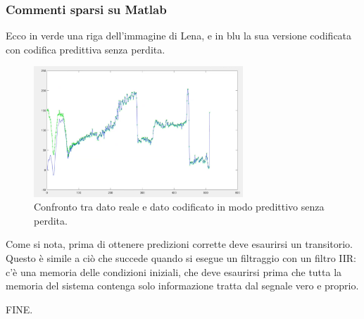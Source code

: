 \documentclass[a4paper,11pt]{article}
\begin{document}
\subsubsection{Commenti sparsi su Matlab}
Ecco in verde una riga dell'immagine di Lena, e in blu la sua versione codificata con codifica predittiva senza perdita.

\renewcommand{\thefigure}{14.1}
\begin{figure}[!h]
  \centering
    \includegraphics[width=0.7\textwidth]{images/14/lena_predicted.png}
    \caption{Confronto tra dato reale e dato codificato in modo predittivo senza perdita.}
\end{figure}

Come si nota, prima di ottenere predizioni corrette deve esaurirsi un transitorio. Questo è simile a ciò che
succede quando si esegue un filtraggio con un filtro IIR: c'è una memoria delle condizioni iniziali, che deve esaurirsi prima che tutta la memoria del sistema contenga solo informazione tratta dal
segnale vero e proprio.

\leavevmode
\newline
\newline
\newline
\newline
\newline
\newline
\begin{center}
    \huge FINE.
\end{center}


\newpage
\end{document}
